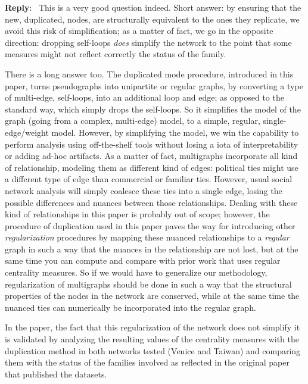 \documentclass[11pt]{article}
\newcounter{reviewer}
\newcounter{point}[reviewer]
\newenvironment{reply}
   {\medskip \noindent \begin{sf}\textbf{Reply}:\  }
   {\medskip \end{sf}}
\begin{document}
\begin{reply}
    This is a very good question indeed. Short answer: by ensuring that the new,
    duplicated, nodes, are structurally equivalent to the ones they replicate,
    we avoid this risk of simplification; as a matter of fact, we go in the
    opposite direction: dropping self-loops {\em does} simplify the network to
    the point that some measures might not reflect correctly the status of the
    family.

    There is a long answer too. The {\sf duplicated mode} procedure, introduced
    in this paper, turns pseudographs into unipartite or regular graphs, by
    converting a type of multi-edge, self-loops, into an additional loop and
    edge; as opposed to the standard way, which simply drops the self-loops. So
    it simplifies the model of the graph (going from a complex, multi-edge)
    model, to a simple, regular, single-edge/weight model. However, by
    simplifying the model, we win the capability to perform analysis using
    off-the-shelf tools without losing a iota of interpretability or adding
    ad-hoc artifacts. As a matter of fact, multigraphs incorporate all kind of
    relationship, modeling them as different kind of edges: political ties might
    use a different type of edge than commercial or familiar ties. However,
    usual social network analysis will simply coalesce these ties into a single
    edge, losing the possible differences and nuances between those
    relationships. Dealing with these kind of relationships in this paper is
    probably out of scope; however, the procedure of duplication used in this
    paper paves the way for introducing other {\em regularization} procedures by
    mapping these nuanced relationships to a {\em regular} graph in such a way
    that the nuances in the relationship are not lost, but at the same time you
    can compute and compare with prior work that uses regular centrality
    measures. So if we would have to generalize our methodology, regularization
    of multigraphs should be done in such a way that the structural properties
    of the nodes in the network are conserved, while at the same time the
    nuanced ties can numerically be incorporated into the regular graph.

    In the paper, the fact that this regularization of the network does not
    simplify it is validated by analyzing the resulting values of the centrality
    measures with the {\sf duplication} method in both networks tested (Venice
    and Taiwan) and comparing them with the status of the families involved as
    reflected in the original paper that published the datasets.
\end{reply}
\end{document}
